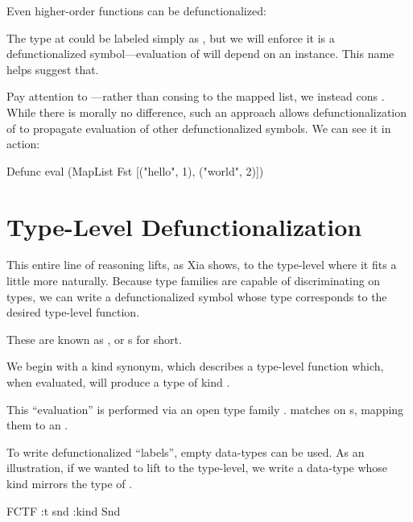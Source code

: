 \documentclass[book.tex]{subfiles}
\begin{document}
Even higher-order functions can be defunctionalized:


The  type at  could be labeled simply as , but we will
enforce it is a defunctionalized symbol---evaluation of  will depend on
an  instance. This name helps suggest that.


Pay attention to ---rather than consing  to the mapped list, we
instead cons . While there is morally no difference, such an
approach allows defunctionalization of  to propagate evaluation of other
defunctionalized symbols. We can see it in action:

\begin{dorepl}{Defunc}
eval (MapList Fst [("hello", 1), ("world", 2)])
\end{dorepl}


\section{Type-Level Defunctionalization} \label{fcf}


This entire line of reasoning lifts, as Xia shows, to the type-level where it
fits a little more naturally. Because type families are capable of
discriminating on types, we can write a defunctionalized symbol whose type
corresponds to the desired type-level function.

These are known as , or
s for short.

We begin with a kind synonym,  which describes a type-level function
which, when evaluated, will produce a type of kind .


This ``evaluation'' is performed via an open type family . 
matches on s, mapping them to an .


To write defunctionalized ``labels'', empty data-types can be used. As an
illustration, if we wanted to lift  to the type-level, we write a
data-type whose kind mirrors the type of .


\begin{dorepl}{FCTF}
:t snd
:kind Snd
\end{dorepl}
\end{document}
